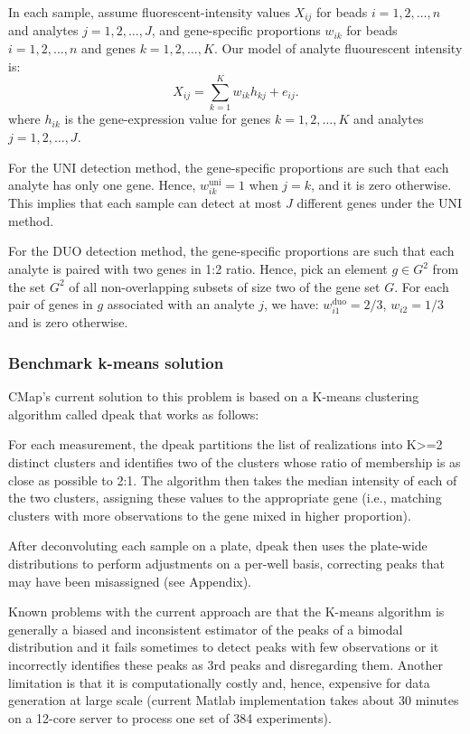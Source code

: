 \documentclass[]{article}
\begin{document}
In each sample, assume fluorescent-intensity values \(X_{ij}\) for beads
\(i=1,2,\dots, n\) and analytes \(j=1,2,\dots, J\), and gene-specific
proportions \(w_{ik}\) for beads \(i=1,2,\dots, n\) and genes
\(k=1,2,\dots, K\). Our model of analyte fluourescent intensity is: \[
  X_{ij} = \sum_{k=1}^{K} w_{ik} h_{kj} + e_{ij}. 
\] where \(h_{ik}\) is the gene-expression value for genes
\(k=1,2,\dots, K\) and analytes \(j=1,2,\dots, J\).

For the UNI detection method, the gene-specific proportions are such
that each analyte has only one gene. Hence, \(w^{\text{uni}}_{ik} = 1\)
when \(j = k\), and it is zero otherwise. This implies that each sample
can detect at most \(J\) different genes under the UNI method.

For the DUO detection method, the gene-specific proportions are such
that each analyte is paired with two genes in 1:2 ratio. Hence, pick an
element \(g\in G^2\) from the set \(G^2\) of all non-overlapping subsets
of size two of the gene set \(G\). For each pair of genes in \(g\)
associated with an analyte \(j\), we have:
\(w^{\text{duo}}_{i1} = 2/3\), \(w_{i2}=1/3\) and is zero otherwise.

\hypertarget{benchmark-k-means-solution-1}{%
\subsubsection{Benchmark k-means
solution}\label{benchmark-k-means-solution-1}}

CMap's current solution to this problem is based on a K-means clustering
algorithm called dpeak that works as follows:

For each measurement, the dpeak partitions the list of realizations into
K\textgreater=2 distinct clusters and identifies two of the clusters
whose ratio of membership is as close as possible to 2:1. The algorithm
then takes the median intensity of each of the two clusters, assigning
these values to the appropriate gene (i.e., matching clusters with more
observations to the gene mixed in higher proportion).

After deconvoluting each sample on a plate, dpeak then uses the
plate-wide distributions to perform adjustments on a per-well basis,
correcting peaks that may have been misassigned (see Appendix).

Known problems with the current approach are that the K-means algorithm
is generally a biased and inconsistent estimator of the peaks of a
bimodal distribution and it fails sometimes to detect peaks with few
observations or it incorrectly identifies these peaks as 3rd peaks and
disregarding them. Another limitation is that it is computationally
costly and, hence, expensive for data generation at large scale (current
Matlab implementation takes about 30 minutes on a 12-core server to
process one set of 384 experiments).
\end{document}
